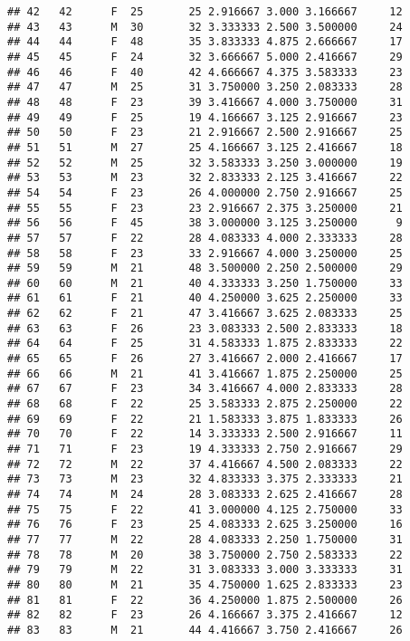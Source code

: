 \documentclass[
]{article}
\begin{document}
\begin{verbatim}
## 42   42      F  25       25 2.916667 3.000 3.166667     12
## 43   43      M  30       32 3.333333 2.500 3.500000     24
## 44   44      F  48       35 3.833333 4.875 2.666667     17
## 45   45      F  24       32 3.666667 5.000 2.416667     29
## 46   46      F  40       42 4.666667 4.375 3.583333     23
## 47   47      M  25       31 3.750000 3.250 2.083333     28
## 48   48      F  23       39 3.416667 4.000 3.750000     31
## 49   49      F  25       19 4.166667 3.125 2.916667     23
## 50   50      F  23       21 2.916667 2.500 2.916667     25
## 51   51      M  27       25 4.166667 3.125 2.416667     18
## 52   52      M  25       32 3.583333 3.250 3.000000     19
## 53   53      M  23       32 2.833333 2.125 3.416667     22
## 54   54      F  23       26 4.000000 2.750 2.916667     25
## 55   55      F  23       23 2.916667 2.375 3.250000     21
## 56   56      F  45       38 3.000000 3.125 3.250000      9
## 57   57      F  22       28 4.083333 4.000 2.333333     28
## 58   58      F  23       33 2.916667 4.000 3.250000     25
## 59   59      M  21       48 3.500000 2.250 2.500000     29
## 60   60      M  21       40 4.333333 3.250 1.750000     33
## 61   61      F  21       40 4.250000 3.625 2.250000     33
## 62   62      F  21       47 3.416667 3.625 2.083333     25
## 63   63      F  26       23 3.083333 2.500 2.833333     18
## 64   64      F  25       31 4.583333 1.875 2.833333     22
## 65   65      F  26       27 3.416667 2.000 2.416667     17
## 66   66      M  21       41 3.416667 1.875 2.250000     25
## 67   67      F  23       34 3.416667 4.000 2.833333     28
## 68   68      F  22       25 3.583333 2.875 2.250000     22
## 69   69      F  22       21 1.583333 3.875 1.833333     26
## 70   70      F  22       14 3.333333 2.500 2.916667     11
## 71   71      F  23       19 4.333333 2.750 2.916667     29
## 72   72      M  22       37 4.416667 4.500 2.083333     22
## 73   73      M  23       32 4.833333 3.375 2.333333     21
## 74   74      M  24       28 3.083333 2.625 2.416667     28
## 75   75      F  22       41 3.000000 4.125 2.750000     33
## 76   76      F  23       25 4.083333 2.625 3.250000     16
## 77   77      M  22       28 4.083333 2.250 1.750000     31
## 78   78      M  20       38 3.750000 2.750 2.583333     22
## 79   79      M  22       31 3.083333 3.000 3.333333     31
## 80   80      M  21       35 4.750000 1.625 2.833333     23
## 81   81      F  22       36 4.250000 1.875 2.500000     26
## 82   82      F  23       26 4.166667 3.375 2.416667     12
## 83   83      M  21       44 4.416667 3.750 2.416667     26

\end{verbatim}
\end{document}
